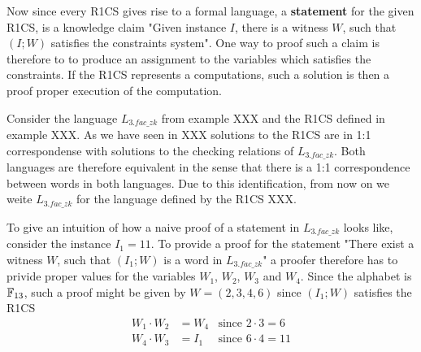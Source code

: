 Now since every R1CS gives rise to a formal language, a \textbf{statement} for the given R1CS, is a knowledge claim "Given instance $I$, there is a witness $W$, such that $(I;W)$ satisfies the constraints system". One way to proof such a claim is therefore to to produce an assignment to the variables which satisfies the constraints. If the R1CS represents a computations, such a solution is then a proof proper execution of the computation.
\begin{example}[3-Factorization]Consider the language $L_{3.fac\_zk}$ from example XXX and the R1CS defined in example XXX. As we have seen in XXX solutions to the R1CS are in 1:1 correspondense with solutions to the checking relations of $L_{3.fac\_zk}$. Both languages are therefore equivalent in the sense that there is a 1:1 correspondence between words in both languages. Due to this identification, from now on we weite $L_{3.fac\_zk}$ for the language defined by the R1CS XXX.

To give an intuition of how a naive proof of a statement in $L_{3.fac\_zk}$ looks like, consider the instance $I_1= 11$. To provide a proof for the statement "There exist a witness $W$, such that $(I_1;W)$ is a word in $L_{3.fac\_zk}$" a proofer therefore has to privide proper values for the variables $W_1$, $W_2$, $W_3$ and $W_4$. Since the alphabet is $\mathbb{F}_{13}$, such a proof might be given by
$W=(2,3,4,6)$ since $(I_1;W)$ satisfies the R1CS
\begin{align*}
W_1 \cdot W_2 &= W_4 & \text{since } 2\cdot 3 = 6\\
W_4 \cdot W_3 &= I_1 & \text{since } 6\cdot 4 = 11
\end{align*}
\end{example}


